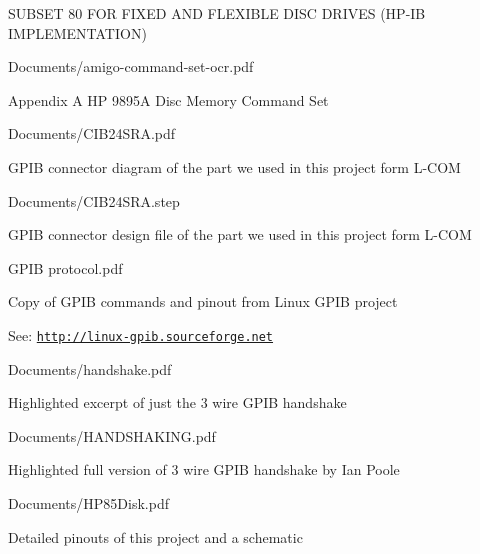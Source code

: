 \begin{DoxyItemize}
\begin{DoxyItemize}
\item S\+U\+B\+S\+ET 80 F\+OR F\+I\+X\+ED A\+ND F\+L\+E\+X\+I\+B\+LE D\+I\+SC D\+R\+I\+V\+ES (H\+P-\/\+IB I\+M\+P\+L\+E\+M\+E\+N\+T\+A\+T\+I\+ON)
\end{DoxyItemize}
\item Documents/amigo-\/command-\/set-\/ocr.\+pdf
\begin{DoxyItemize}
\item Appendix A HP 9895A Disc Memory Command Set
\end{DoxyItemize}
\item Documents/\+C\+I\+B24\+S\+R\+A.\+pdf
\begin{DoxyItemize}
\item G\+P\+IB connector diagram of the part we used in this project form L-\/\+C\+OM
\end{DoxyItemize}
\item Documents/\+C\+I\+B24\+S\+R\+A.\+step
\begin{DoxyItemize}
\item G\+P\+IB connector design file of the part we used in this project form L-\/\+C\+OM
\end{DoxyItemize}
\item G\+P\+IB protocol.\+pdf
\begin{DoxyItemize}
\item Copy of G\+P\+IB commands and pinout from Linux G\+P\+IB project
\item See\+: \href{http://linux-gpib.sourceforge.net}{\tt http\+://linux-\/gpib.\+sourceforge.\+net}
\end{DoxyItemize}
\item Documents/handshake.\+pdf
\begin{DoxyItemize}
\item Highlighted excerpt of just the 3 wire G\+P\+IB handshake
\end{DoxyItemize}
\item Documents/\+H\+A\+N\+D\+S\+H\+A\+K\+I\+N\+G.\+pdf
\begin{DoxyItemize}
\item Highlighted full version of 3 wire G\+P\+IB handshake by Ian Poole
\end{DoxyItemize}
\item Documents/\+H\+P85\+Disk.\+pdf
\begin{DoxyItemize}
\item Detailed pinouts of this project and a schematic
\end{DoxyItemize}

\end{DoxyItemize}
